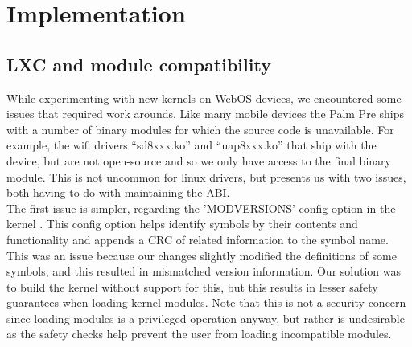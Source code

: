 \section{Implementation}
\label{sec:impl}

\subsection{LXC and module compatibility}

While experimenting with new kernels on WebOS devices, we encountered some issues that required work arounds.  Like many mobile devices the Palm Pre ships with a number of binary modules for which the source code is unavailable.  For example, the wifi drivers ``sd8xxx.ko'' and ``uap8xxx.ko'' that ship with the device, but are not open-source and so we only have access to the final binary module.  This is not uncommon for linux drivers, but presents us with two issues, both having to do with maintaining the ABI. \\

    The first issue is simpler, regarding the 'MODVERSIONS' config option in the kernel \cite{modversions}.  This config option helps identify symbols by their contents and functionality and appends a CRC of related information to the symbol name.  This was an issue because our changes slightly modified the definitions of some symbols, and this resulted in mismatched version information.  Our solution was to build the kernel without support for this, but this results in lesser safety guarantees when loading kernel modules.  Note that this is not a security concern since loading modules is a privileged operation anyway, but rather is undesirable as the safety checks help prevent the user from loading incompatible modules. \\


